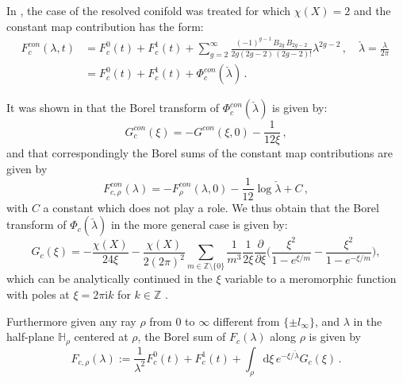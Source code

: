 \documentclass[a4paper,12pt,justification=centering]{article}
\numberwithin{equation}{section}
\newcommand{\I}{{\mathrm i}}
\theoremstyle{plain}%
\theoremstyle{definition}
\begin{document}
In \cite{Alim:2021mhp}, the case of the resolved conifold was treated for which $\chi(X)=2$ and the constant map contribution has the form:
\begin{align} \label{constmapcon}
F^{con}_{c}(\lambda,t)&= F_c^0 (t) + F_c^1(t)+   \sum_{g=2}^{\infty} \frac{ (-1)^{g-1}\, B_{2g}\, B_{2g-2}}{2g (2g-2)\, (2g-2)!} \lambda^{2g-2} \,, \quad \check{\lambda}=\frac{\lambda}{2\pi}\,\\
&= F_c^0 (t) + F_c^1(t)+  \Phi_c^{con}(\check{\lambda})\,.
\end{align} 

It was shown in \cite{Alim:2021mhp} that the Borel transform of $ \Phi_c^{con}(\check{\lambda})$ is given by:
\begin{equation}
G_c^{con}(\xi)= -G^{con}(\xi,0)-\frac{1}{12\xi}\,,
\end{equation}
and that correspondingly the Borel sums of the constant map contributions are given by
\begin{equation}
F^{con}_{c,\rho}(\lambda)= - F^{con}_{\rho}(\lambda,0)-\frac{1}{12}\log \check{\lambda}+C\,,
\end{equation}
with $C$ a constant which does not play a role. 
We thus obtain that the Borel transform of $\Phi_c(\check{\lambda})$ in the more general case is given by:
    \begin{equation}\label{Borel-sum-const}
        G_c(\xi) =-\frac{\chi(X)}{24\xi} - \frac{\chi(X)}{2(2\pi )^2}\sum_{m\in\mathbb{Z} \setminus \{0\}}\frac{1}{m^3}
        \frac{1}{2\xi}\frac{\partial}{\partial \xi}
        \bigg(\frac{\xi^2}{1-e^{ \xi/m}}-\frac{\xi^2}{1-e^{- \xi/m}}\bigg),
\end{equation}
which can be analytically continued in the $\xi$ variable to a meromorphic function with poles at $\xi=2\pi \I k $ for $k \in \mathbb{Z}$ .

Furthermore given any ray $\rho$ from $0$ to $\infty$ different from $\{\pm l_{\infty}\}$, and $\lambda$ in the half-plane $\mathbb{H}_{\rho}$ centered at $\rho$, the Borel sum of $F_c(\lambda)$ along $\rho$ is given by
\begin{equation}\label{BorelSconst}
    F_{c,\rho}(\lambda):=\frac{1}{\lambda^2} F^0_c(t)+ F^1_c(t) +\int_{\rho}\mathrm d\xi\, e^{-\xi/\check{\lambda}} G_c(\xi)\,.
\end{equation}
\end{document}
